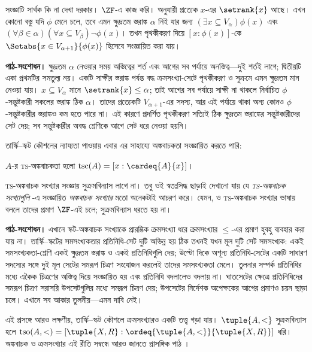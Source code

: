 \documentclass[../../../include/open-logic-section]{subfiles}
\begin{document}
সংজ্ঞাটি সার্থক কি না দেখা দরকার। $\ZF$-এ কাজ করি।
অনুযায়ী প্রত্যেক $x$-এর $\setrank{x}$ আছে।
এখন কোনো বস্তু যদি $\phi$ মেনে চলে, তবে এমন
ক্ষুদ্রতম স্তরাঙ্ক $\alpha$ নিই যার জন্য
$(\exists x\subseteq V_\alpha)\phi(x)$ এবং
$(\forall \beta\in \alpha)(\forall x \subseteq V_\beta)
\lnot \phi(x)$। তখন পৃথকীকরণ দিয়ে
$[x : \phi(x)]$-কে
$\Setabs{x \in V_{\alpha+1}}{\phi(x)}$
হিসেবে সংজ্ঞায়িত করা যায়।
\par\noindent\textbf{পাঠ-সংশোধন।} ক্ষুদ্রতম $\alpha$ নেওয়ার সময় অস্তিত্বের শর্ত এবং আগের
সব পর্যায়ে অনস্তিত্ব—দুই শর্তই লাগে; দ্বিতীয়টি একা প্রথমটির
সমতুল্য নয়। একটি সাক্ষীর স্তরাঙ্ক পর্যন্ত বদ্ধ ক্রমসংখ্যা-সেটে
পৃথকীকরণ ও সুক্রমে এমন ক্ষুদ্রতম মান নেওয়া যায়।
$x\subseteq V_\alpha$ মানে $\setrank{x}\leq\alpha$;
তাই আগের সব পর্যায়ে সাক্ষী না থাকলে নির্বাচিত
$\phi$-সন্তুষ্টকারী সকলের স্তরাঙ্ক ঠিক $\alpha$। তাদের
প্রত্যেকটি $V_{\alpha+1}$-এর সদস্য, আর এই পর্যায়ে থাকা
অন্য কোনও $\phi$-সন্তুষ্টকারীর স্তরাঙ্কও কম হতে পারে না।
এই কারণে প্রদর্শিত পৃথকীকরণ সত্যিই ঠিক ক্ষুদ্রতম স্তরাঙ্কের
সন্তুষ্টকারীদের সেট দেয়; সব সন্তুষ্টকারীর অবদ্ধ শ্রেণিকে
আগে সেট ধরে নেওয়া হয়নি।

তার্স্কি--স্কট কৌশলের ন্যায্যতা পাওয়ায় এবার এর
সাহায্যে অঙ্কবাচকতা সংজ্ঞায়িত করতে পারি:

\begin{defn}
$A$-র \textsc{ts}-অঙ্কবাচকতা হলো
$\text{tsc}(A) = [x : \cardeq{A}{x}]$।
\end{defn}

\textsc{ts}-অঙ্কবাচক সংখ্যার সংজ্ঞায় সুক্রমবিন্যাস
লাগে না। তবু ওই স্বতঃসিদ্ধ ছাড়াই দেখানো যায় যে
\emph{\textsc{ts}-অঙ্কবাচক সংখ্যাগুলি}
-এ
সংজ্ঞায়িত \emph{অঙ্কবাচক সংখ্যার} মতো অনেকটাই
আচরণ করে। যেমন,
ও 
\textsc{ts}-অঙ্কবাচক সংখ্যার ভাষায় বললে তাদের
প্রমাণ $\ZF$-এই চলে; সুক্রমবিন্যাস ধরতে হয় না।
\par\noindent\textbf{পাঠ-সংশোধন।} এখানে স্কট-অঙ্কবাচক সংখ্যাকে প্রারম্ভিক ক্রমসংখ্যা ধরে
ক্রমসংখ্যার $\leq$-এর প্রমাণ হুবহু ব্যবহার করা যায় না।
তার্স্কি--স্কটের সমসংখ্যকতার প্রতিনিধি-সেট দুটি অভিন্ন হয়
ঠিক তখনই যখন মূল দুটি সেট সমসংখ্যক: একই সমসংখ্যকতা-শ্রেণি
একই ক্ষুদ্রতম স্তরাঙ্ক ও একই প্রতিনিধিগুলি দেয়; উল্টো দিকে
অশূন্য প্রতিনিধি-সেটের একটি সাধারণ সদস্যের সঙ্গে দুই মূল
সেটের সমরূপ চিত্রণ সংযোজন করলেই তাদের সমসংখ্যকতা মেলে।
তুলনার সম্পর্ক প্রতিনিধির মধ্যে একৈক চিত্রণের অস্তিত্ব দিয়ে
সংজ্ঞায়িত হয় এবং প্রতিনিধি বদলালেও বদলায় না। ঘাতসেটের
ক্ষেত্রে প্রতিনিধিদের সমরূপ চিত্রণ সরাসরি উপসেটগুলির মধ্যে
সমরূপ চিত্রণ দেয়; উপসেটের নির্দেশক অপেক্ষকের আগের প্রমাণও
চয়ন ছাড়া চলে। এখানে সব আকার তুলনীয়—এমন দাবি নেই।

এই প্রসঙ্গে আরও লক্ষণীয়, তার্স্কি--স্কট কৌশলে
ক্রমসংখ্যারও একটি তত্ত্ব গড়া যায়।
$\tuple{A, <}$ সুক্রমবিন্যাস হলে
$\text{tso}(A, <) = [\tuple{X,
R} : \ordeq{\tuple{A, <}}{\tuple{X, R}}]$
ধরি। অঙ্কবাচক ও ক্রমসংখ্যার এই রীতি সম্বন্ধে আরও
জানতে প্রাসঙ্গিক পাঠ \citet[chs.~9--12]{Potter2004}।
\end{document}
